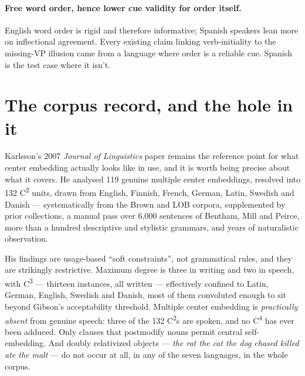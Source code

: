 \documentclass[11pt, a4paper]{article}
\begin{document}
\paragraph{Free word order, hence lower cue validity for order itself.} English word order is rigid and therefore informative; Spanish speakers lean more on inflectional agreement. Every existing claim linking verb-initiality to the missing-VP illusion came from a language where order is a reliable cue. Spanish is the test case where it isn't.

\section{The corpus record, and the hole in it}

Karlsson's 2007 \emph{Journal of Linguistics} paper remains the reference point for what center embedding actually looks like in use, and it is worth being precise about what it covers. He analysed 119 genuine multiple center embeddings, resolved into 132 C\textsuperscript{2} units, drawn from English, Finnish, French, German, Latin, Swedish and Danish --- systematically from the Brown and LOB corpora, supplemented by prior collections, a manual pass over 6,000 sentences of Bentham, Mill and Peirce, more than a hundred descriptive and stylistic grammars, and years of naturalistic observation.

His findings are usage-based ``soft constraints'', not grammatical rules, and they are strikingly restrictive. Maximum degree is three in writing and two in speech, with C\textsuperscript{3} --- thirteen instances, all written --- effectively confined to Latin, German, English, Swedish and Danish, most of them convoluted enough to sit beyond Gibson's acceptability threshold. Multiple center embedding is \emph{practically absent} from genuine speech: three of the 132 C\textsuperscript{2}s are spoken, and no C\textsuperscript{4} has ever been adduced. Only clauses that postmodify nouns permit central self-embedding. And doubly relativized objects --- \emph{the rat the cat the dog chased killed ate the malt} --- do not occur at all, in any of the seven languages, in the whole corpus.
\end{document}
